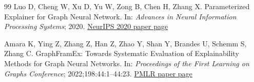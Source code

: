 \documentclass[11pt,a4paper]{article}
\begin{document}
\begin{thebibliography}{99}
Luo D, Cheng W, Xu D, Yu W, Zong B, Chen H, Zhang X. Parameterized Explainer for Graph Neural Network. In: \emph{Advances in Neural Information Processing Systems}; 2020.\newline
\href{https://proceedings.neurips.cc/paper/2020/hash/e37b08dd3015330dcbb5d6663667b8b8-Abstract.html}{NeurIPS 2020 paper page}

Amara K, Ying Z, Zhang Z, Han Z, Zhao Y, Shan Y, Brandes U, Schemm S, Zhang C. GraphFramEx: Towards Systematic Evaluation of Explainability Methods for Graph Neural Networks. In: \emph{Proceedings of the First Learning on Graphs Conference}; 2022;198:44:1--44:23.\newline
\href{https://proceedings.mlr.press/v198/amara22a.html}{PMLR paper page}
\end{thebibliography}
\end{document}
